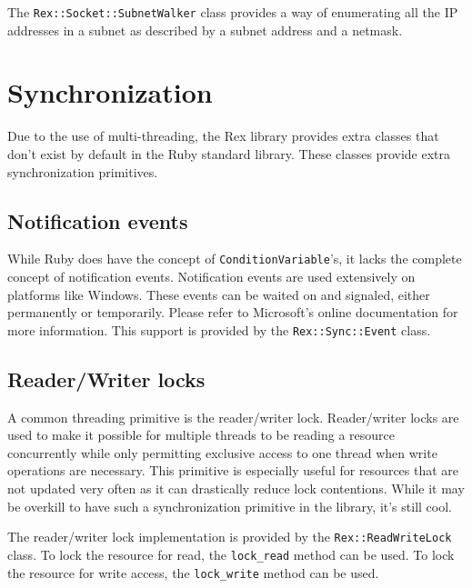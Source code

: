 \documentclass{report}
\begin{document}
\par
The \texttt{Rex::Socket::SubnetWalker} class provides a way of
enumerating all the IP addresses in a subnet as described by a
subnet address and a netmask.

    \section{Synchronization}

\par
Due to the use of multi-threading, the Rex library provides extra
classes that don't exist by default in the Ruby standard library.
These classes provide extra synchronization primitives.

        \subsection{Notification events}

\par
While Ruby does have the concept of \texttt{ConditionVariable}'s, it
lacks the complete concept of notification events.  Notification
events are used extensively on platforms like Windows.  These events
can be waited on and signaled, either permanently or temporarily.
Please refer to Microsoft's online documentation for more
information. This support is provided by the
\texttt{Rex::Sync::Event} class.

        \subsection{Reader/Writer locks}

\par
A common threading primitive is the reader/writer lock.
Reader/writer locks are used to make it possible for multiple
threads to be reading a resource concurrently while only permitting
exclusive access to one thread when write operations are necessary.
This primitive is especially useful for resources that are not
updated very often as it can drastically reduce lock contentions.
While it may be overkill to have such a synchronization primitive in
the library, it's still cool.

\par
The reader/writer lock implementation is provided by the
\texttt{Rex::ReadWriteLock} class.  To lock the resource for read,
the \texttt{lock\_read} method can be used.  To lock the resource
for write access, the \texttt{lock\_write} method can be used.
\end{document}
